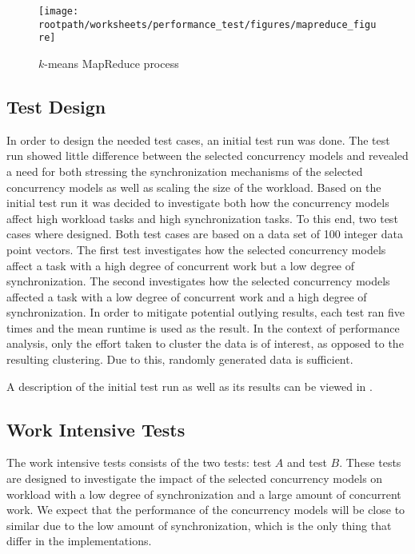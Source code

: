 \begin{figure}
\centering
\texttt{[image: \\rootpath/worksheets/performance\_test/figures/mapreduce\_figure]}
\caption{$k$-means MapReduce process}\label{fig:kmeans_mapreduce}
\end{figure}



\subsection{Test Design}
In order to design the needed test cases, an initial test run was done. The test run showed little difference between the selected concurrency models and revealed a need for both stressing the synchronization mechanisms of the selected concurrency models as well as scaling the size of the workload. Based on the initial test run it was decided to investigate both how the concurrency models affect high workload tasks and high synchronization tasks. To this end, two test cases where designed. Both test cases are based on a data set of 100 integer data point vectors. The first test investigates how the selected concurrency models affect a task with a high degree of concurrent work but a low degree of synchronization. The second investigates how the selected concurrency models affected a task with a low degree of concurrent work and a high degree of synchronization. In order to mitigate potential outlying results, each test ran five times and the mean runtime is used as the result. In the context of performance analysis, only the effort taken to cluster the data is of interest, as opposed to the resulting clustering. Due to this, randomly generated data is sufficient.

A description of the initial test run as well as its results can be viewed in .

\subsection{Work Intensive Tests}
The work intensive tests consists of the two tests: test $A$ and test $B$. These tests are designed to investigate the impact of the selected concurrency models on workload with a low degree of synchronization and a large amount of concurrent work. We expect that the performance of the concurrency models will be close to similar due to the low amount of synchronization, which is the only thing that differ in the implementations.

